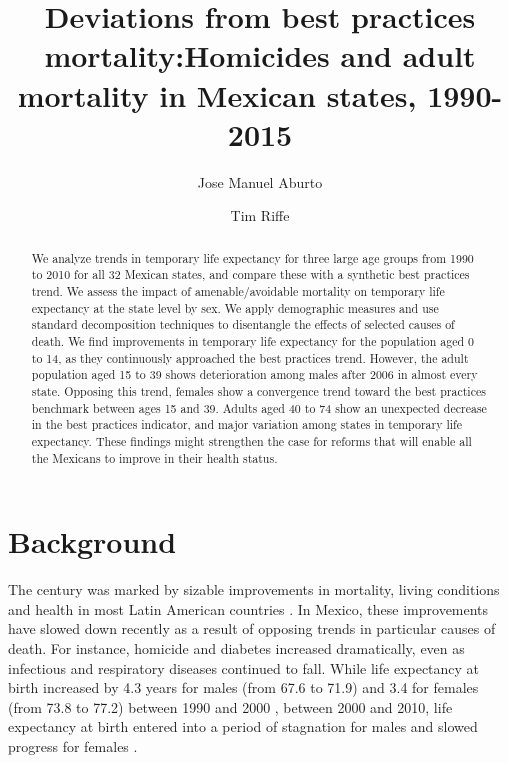 \documentclass{article}
\title{ Deviations from best practices mortality:Homicides and adult mortality in Mexican states, 1990-2015}
\author[1]{Jose Manuel Aburto}
\author[2]{Tim Riffe}
\affil[1]{European Doctoral School of Demography}
\affil[1,2]{Max Planck Institute for Demographic Research}
\begin{document}
\maketitle

\begin{abstract}
We analyze trends in temporary life expectancy for three large age groups from 1990 to 2010 for all 32 Mexican states, and compare these with a synthetic best practices trend. We assess the impact of amenable/avoidable mortality on temporary life expectancy at the state level by sex. We apply demographic measures and use standard decomposition techniques to disentangle the effects of selected causes of death. We find improvements in temporary life expectancy for the population aged 0 to 14, as they continuously approached the best practices trend. However, the adult population aged 15 to 39 shows deterioration among males after 2006 in almost every state. Opposing this trend, females show a convergence trend toward the best practices benchmark between ages 15 and 39. Adults aged 40 to 74 show an unexpected decrease in the best practices indicator, and major variation among states in temporary life expectancy. These findings might strengthen the case for reforms that will enable all the Mexicans to improve in their health status.
​



\end{abstract}


\section*{Background}
The  century was marked by sizable improvements in mortality, living
conditions and health in most Latin American countries \citep{who2000}. 
In Mexico, these improvements have slowed down recently as a result of opposing
trends in particular causes of death. For instance, homicide and diabetes
increased dramatically, even as infectious and
respiratory diseases continued to fall. While life
expectancy at birth increased by 4.3 years for males (from 67.6 to 71.9) and 3.4
for females (from 73.8 to 77.2) between 1990 and 2000 \citep{SOMEDE},
between 2000 and 2010, life expectancy at birth entered into a period of
stagnation for males and slowed progress for females \citep{canudas2014}. 
\end{document}
